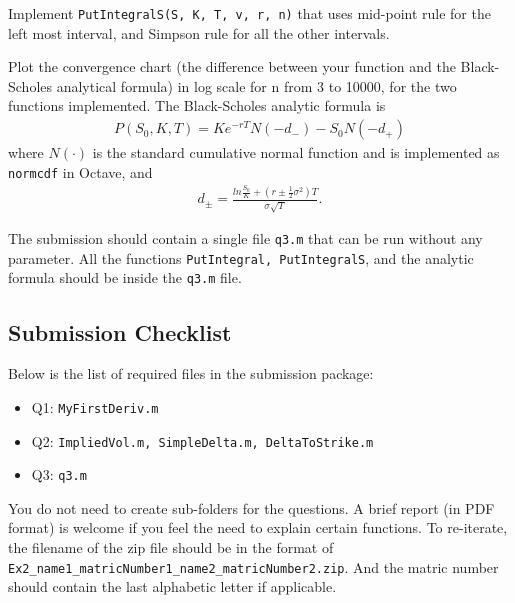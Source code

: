 \documentclass[12pt,a4paper,hidelinks,fleqn]{article}            %
\begin{document}
Implement \verb=PutIntegralS(S, K, T, v, r, n)= that uses mid-point rule for the left most interval, and Simpson rule for all the other intervals.

Plot the convergence chart (the difference between your function and the Black-Scholes analytical formula) in log scale for n from 3 to 10000, for the two functions implemented.
The Black-Scholes analytic formula is
\begin{align*}
P(S_0, K, T) = Ke^{-rT} N(-d_-) - S_0 N(-d_+)
\end{align*}
where $N(\cdot)$ is the standard cumulative normal function and is implemented as \verb=normcdf= in Octave, and
\begin{align*}
d_{\pm} = \frac{ln\frac{S_0}{K} + (r \pm \frac{1}{2}\sigma^2)T}{\sigma\sqrt{T}}.
\end{align*}

The submission should contain a single file \verb=q3.m= that can be run without any parameter. 
All the functions \verb=PutIntegral, PutIntegralS=, and the analytic formula should be inside the \verb=q3.m= file. 


\subsection*{Submission Checklist}
Below is the list of required files in the submission package:
\begin{itemize}
\item Q1: \verb=MyFirstDeriv.m=
\item Q2: \verb=ImpliedVol.m, SimpleDelta.m, DeltaToStrike.m=
\item Q3: \verb=q3.m=
\end{itemize}
You do not need to create sub-folders for the questions. 
A brief report (in PDF format) is welcome if you feel the need to explain certain functions.
To re-iterate, the filename of the zip file should be in the format of \verb=Ex2_name1_matricNumber1_name2_matricNumber2.zip=.
And the matric number should contain the last alphabetic letter if applicable. 
\end{document}

